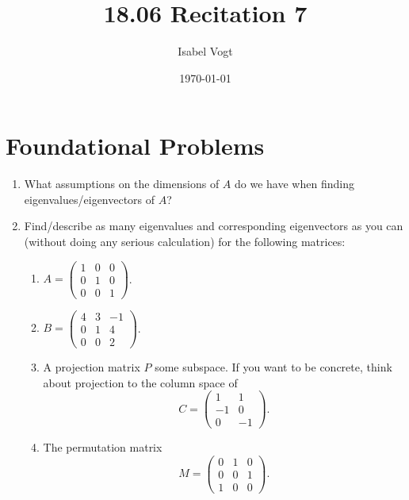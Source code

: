 \documentclass[11pt]{article}
\title{18.06 Recitation 7}
\author{Isabel Vogt}
\date{\today}                                           %
\begin{document}
\maketitle
\section{Foundational Problems}

\begin{enumerate}

\item What assumptions on the dimensions of $A$ do we have when finding eigenvalues/eigenvectors of $A$?

\item Find/describe as many eigenvalues and corresponding eigenvectors as you can (without doing any serious calculation) for the following matrices:

\begin{enumerate}

\item $A = \begin{pmatrix} 1 & 0 & 0 \\ 0 & 1 & 0 \\ 0 & 0 & 1 \end{pmatrix}$.

\item $B = \begin{pmatrix} 4 & 3 & -1 \\ 0 & 1 & 4 \\ 0 & 0 &2 \end{pmatrix}$.

\item A projection matrix $P$ some subspace.  If you want to be concrete, think about projection to the column space of 
\[C = \begin{pmatrix} 1 & 1 \\ -1 & 0 \\ 0 & -1 \end{pmatrix}.\]

\item The permutation matrix
\[M = \begin{pmatrix} 0 & 1 & 0 \\ 0 & 0 & 1 \\ 1 & 0 & 0 \end{pmatrix}. \]


\end{enumerate}
\end{enumerate}
\end{document}

